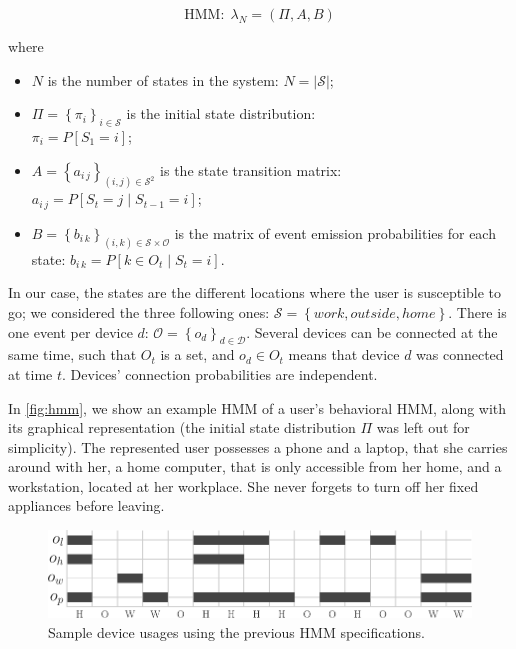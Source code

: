 $$\text{HMM}:\;\lambda_N=(\Pi, A, B)$$

where 
\begin{itemize}
	\item $N$ is the number of states in the system:
	$N = \left| \mathcal{S} \right|$;

	\item $\Pi=\left\{ \pi_i\right\}_{i\in\mathcal{S}}$ is the initial state distribution:\\
	$\pi_i=P[S_1=i]$;

	\item $A = \left\{ a_{i\,j}\right\}_{(i,j)\in\mathcal{S}^2}$ is the state transition matrix:\\
	$a_{i\,j}=P[S_t=j \mid S_{t-1}=i]$;

	\item $B = \left\{ b_{i\,k}\right\}_{(i,k)\in\mathcal{S}\times\mathcal{O}}$ is the matrix of event emission probabilities for each state:
	$b_{i\,k} = P[ k \in O_t \mid S_t = i]$.
\end{itemize}

In our case, the states are the different locations where the user is susceptible to go;
we considered the three following ones: $\mathcal{S}=\left\{ \mathit{work}, \mathit{outside}, \mathit{home} \right\}$. 
There is one event per device $d$: $\mathcal{O} = \left\{ o_d \right\}_{d\in \mathcal{D}}$. Several devices can be connected at the same time, such that $O_t$ is a set, and $o_d \in O_t$ means that device $d$ was connected at time $t$. Devices' connection probabilities are independent.

In \cref{fig:hmm}, we show an example HMM of a user's behavioral HMM, along with its graphical representation (the initial state distribution $\Pi$ was left out for simplicity). 
The represented user possesses a phone and a laptop, that she carries around with her, a home computer, that is only accessible from her home, and a workstation, located at her workplace. She never forgets to turn off her fixed appliances before leaving.

\begin{figure}[t]
\centering
\includegraphics[width=\columnwidth]{figures/sample_usage.pdf}

\caption{\label{fig:sample_usage}Sample device usages using the previous HMM specifications. 
}

\end{figure}

